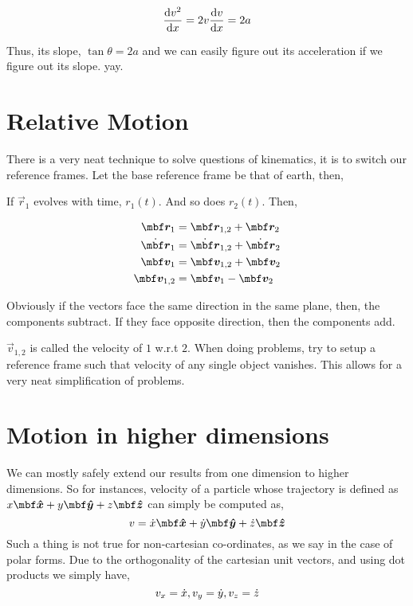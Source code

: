 \begin{equation*}
    \dv{v^2}{x} = 2v \dv{v}{x} = 2a
\end{equation*}

Thus, its slope, \(\tan\theta = 2a\) and we can easily figure out its acceleration 
if we figure out its slope. yay.

\section{Relative Motion}

There is a very neat technique to solve questions of kinematics, it is to switch our 
reference frames. Let the base reference frame be that of earth, then,

\begin{figure}
    [H]
    \centering
\end{figure}

If \(\vec{r}_1\) evolves with time, \(r_1(t)\). And so does \(r_2(t)\). Then,

\begin{align*}
    \vec{r}_1 &= \vec{r}_{1,2} + \vec{r}_2 \\
    \ndiv{\vec{r}}_1 &= \ndiv{\vec{r}}_{1,2} + \ndiv{\vec{r}}_2 \\
    \vec{v}_1 &= \vec{v}_{1,2} + \vec{v}_{2}\\
    \vec{v}_{1,2} &= \vec{v}_1 - \vec{v}_{2}
\end{align*}

Obviously if the vectors face the same direction in the same plane, then, the components subtract. If they face
opposite direction, then the components add. 

\(\vec{v}_{1,2}\) is called the velocity of \(\mathit{1}\) w.r.t \(\mathit{2}\). When doing
problems, try to setup a reference frame such that velocity of any single object vanishes.
This allows for a very neat simplification of problems. 

\section{Motion in higher dimensions}

We can mostly safely extend our results from one dimension to higher dimensions.
So for instances, velocity of a particle whose trajectory is defined as 
\(x\unitv{x} + y\unitv{y} + z\unitv{z}\) can simply be computed as,
\[v = \ndiv{x}\unitv{x} + \ndiv{y}\unitv{y} + \ndiv{z}\unitv{z}\] Such a thing
is not true for non-cartesian co-ordinates, as we say in the case of polar forms.
Due to the orthogonality of the cartesian unit vectors, and using dot products
we simply have, 
\[v_x = \dot{x}, v_y = \dot{y}, v_z = \dot{z}\]


